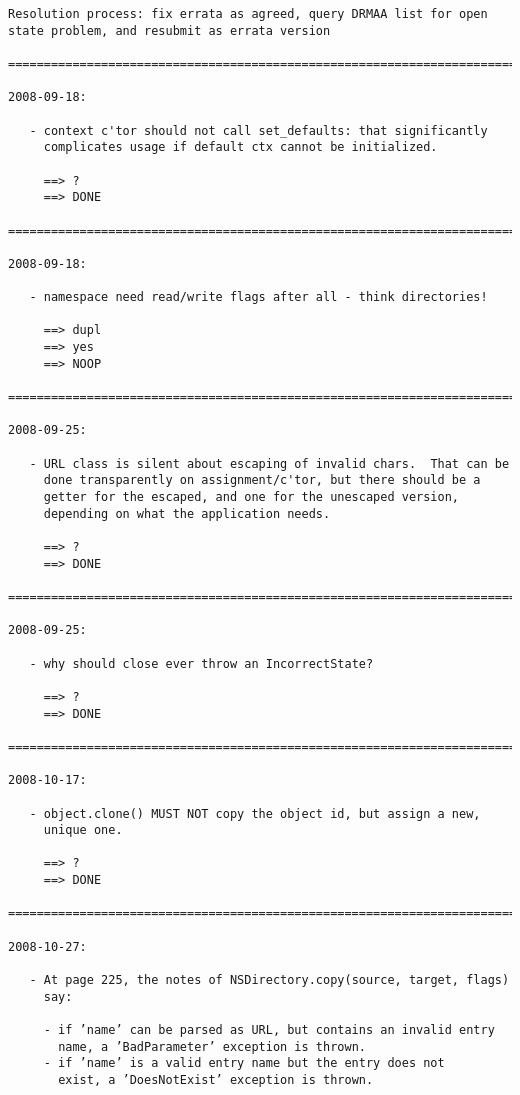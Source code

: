 \documentclass{article}
\begin{document}
\begin{verbatim}
Resolution process: fix errata as agreed, query DRMAA list for open
state problem, and resubmit as errata version

=========================================================================

2008-09-18:

   - context c'tor should not call set_defaults: that significantly
     complicates usage if default ctx cannot be initialized.

     ==> ?
     ==> DONE

=========================================================================

2008-09-18:

   - namespace need read/write flags after all - think directories!

     ==> dupl
     ==> yes
     ==> NOOP

=========================================================================

2008-09-25:

   - URL class is silent about escaping of invalid chars.  That can be
     done transparently on assignment/c'tor, but there should be a
     getter for the escaped, and one for the unescaped version,
     depending on what the application needs.

     ==> ?
     ==> DONE

=========================================================================

2008-09-25:

   - why should close ever throw an IncorrectState?

     ==> ?
     ==> DONE

=========================================================================

2008-10-17:

   - object.clone() MUST NOT copy the object id, but assign a new,
     unique one.

     ==> ?
     ==> DONE

=========================================================================

2008-10-27:

   - At page 225, the notes of NSDirectory.copy(source, target, flags)
     say:

     - if ’name’ can be parsed as URL, but contains an invalid entry
       name, a ’BadParameter’ exception is thrown.
     - if ’name’ is a valid entry name but the entry does not
       exist, a ’DoesNotExist’ exception is thrown.


\end{verbatim}
\end{document}
